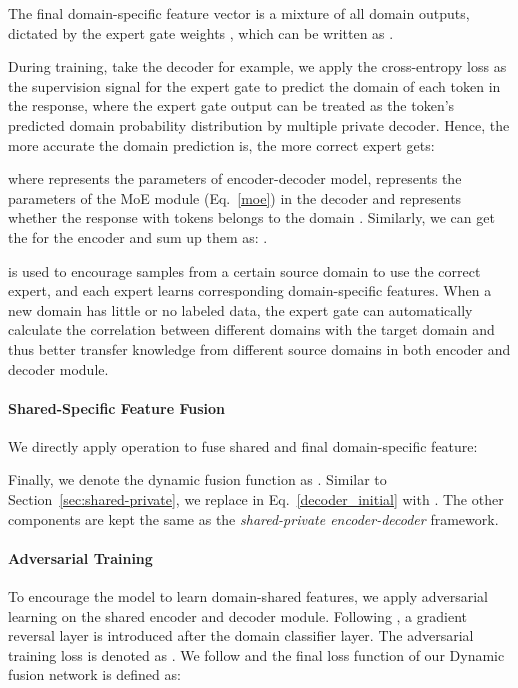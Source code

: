 \documentclass[11pt,a4paper]{article}
\begin{document}
The final domain-specific feature vector is a mixture of all domain outputs, dictated by the expert gate weights , which can be written as .

During training, take the decoder for example, we apply the cross-entropy loss  as the supervision signal for the expert gate to predict the domain of each token in the response, where the expert gate output  can be treated as the  token's predicted domain probability distribution by multiple private decoder.
Hence, the more accurate the domain prediction is, the more correct expert gets:

where  represents the parameters of encoder-decoder model,  represents the parameters of the MoE module (Eq.~\ref{moe}) in the decoder and  represents whether the response with  tokens belongs to the domain .
Similarly, we can get the  for the encoder and sum up them as: .

 is used to encourage samples from a certain source domain to use the correct expert, and each expert learns corresponding domain-specific features. 
When a new domain has little or no labeled data, the expert gate can automatically calculate the correlation between different domains with the target domain and thus better transfer knowledge from different source domains in both encoder and decoder module.

\paragraph{Shared-Specific Feature Fusion}
We directly apply  operation to fuse shared and final domain-specific feature:
 

Finally, we denote the dynamic fusion function as . Similar to Section~\ref{sec:shared-private}, we replace  in Eq.~\ref{decoder_initial} with . The other components are kept the same as the \textit{shared-private encoder-decoder} framework.

\paragraph{Adversarial Training}
To encourage the model to learn domain-shared features, we apply adversarial learning on the shared encoder and decoder module.
Following , a gradient reversal layer \cite{ganin2014unsupervised} is introduced after the domain classifier layer.
The adversarial training loss is denoted as .
 We follow  and the final loss function of our Dynamic fusion network is defined as:
\end{document}
